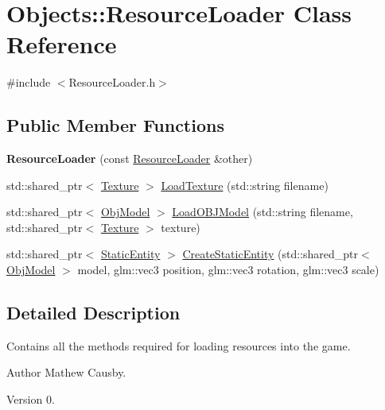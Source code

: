 \hypertarget{class_objects_1_1_resource_loader}{}\section{Objects\+:\+:Resource\+Loader Class Reference}
\label{class_objects_1_1_resource_loader}


{\ttfamily \#include $<$Resource\+Loader.\+h$>$}

\subsection*{Public Member Functions}
\begin{DoxyCompactItemize}
\item 
\mbox{\label{class_objects_1_1_resource_loader_a7fb135bf2dcf39443bc4daf17909c824}} 
{\bfseries Resource\+Loader} (const \hyperlink{class_objects_1_1_resource_loader}{Resource\+Loader} \&other)
\item 
std\+::shared\+\_\+ptr$<$ \hyperlink{class_objects_1_1_texture}{Texture} $>$ \hyperlink{class_objects_1_1_resource_loader_ad1ae22e95d946ef6679f7a21d4cf63d4}{Load\+Texture} (std\+::string filename)
\item 
std\+::shared\+\_\+ptr$<$ \hyperlink{class_objects_1_1_obj_model}{Obj\+Model} $>$ \hyperlink{class_objects_1_1_resource_loader_abc104a8a3963672a9f27419cd64f3930}{Load\+O\+B\+J\+Model} (std\+::string filename, std\+::shared\+\_\+ptr$<$ \hyperlink{class_objects_1_1_texture}{Texture} $>$ texture)
\item 
std\+::shared\+\_\+ptr$<$ \hyperlink{class_objects_1_1_static_entity}{Static\+Entity} $>$ \hyperlink{class_objects_1_1_resource_loader_ac0150dbe31ca7fbbbc2b88127daa36be}{Create\+Static\+Entity} (std\+::shared\+\_\+ptr$<$ \hyperlink{class_objects_1_1_obj_model}{Obj\+Model} $>$ model, glm\+::vec3 position, glm\+::vec3 rotation, glm\+::vec3 scale)
\end{DoxyCompactItemize}


\subsection{Detailed Description}
Contains all the methods required for loading resources into the game. \begin{DoxyAuthor}{Author}
Mathew Causby. 
\end{DoxyAuthor}
\begin{DoxyVersion}{Version}
0. 
\end{DoxyVersion}


